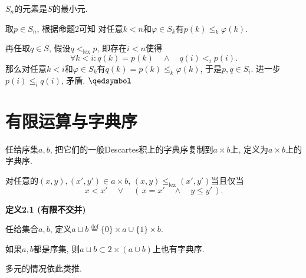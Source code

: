 \vspace{5pt}\hspace{-1em}{\kaishu 命题3.} $S_n$的元素是$S$的最小元.

\vspace{3pt}
取$p\in S_n$, 根据命题2可知
对任意$k<n$和$\varphi\in S_k$有$p(k)\leqslant_k\varphi(k)$.

再任取$q\in S$, 假设$q<_{\mathrm{lex}}p$, 即存在$i<n$使得
\[
    \forall k<i:q(k)=p(k)\quad\land\quad q(i)<_ip(i).
\]
那么对任意$k<i$和$\varphi\in S_k$有$q(k)=p(k)\leqslant_k\varphi(k)$,
于是$p,q\in S_i$. 进一步$p(i)\leqslant_iq(i)$, 矛盾. \hfill $\qedsymbol$





\vspace{20pt}

\section{有限运算与字典序}

任给序集$a,b$, 把它们的一般Descartes积上的字典序复制到$a\times b$上,
定义为$a\times b$上的字典序.

对任意的$(x,y),(x',y')\in a\times b$,
$(x,y)\leqslant_{\mathrm{lex}}(x',y')$当且仅当
\[
    x<x'\quad\lor\quad(\,x=x'\quad\land\quad y\leqslant y'\,).
\]

\vspace{10pt}

\hypertarget{sec:定义2.1}{}
\noindent\textbf{定义2.1 (有限不交并)}

任给集合$a,b$, 定义$a\sqcup b\overset{\mathrm{def}}{=}
\{0\}\times a\cup\{1\}\times b$.

如果$a,b$都是序集, 则$a\sqcup b\subset 2\times(a\cup b)$上也有字典序.

\vspace{10pt}

多元的情况依此类推.

